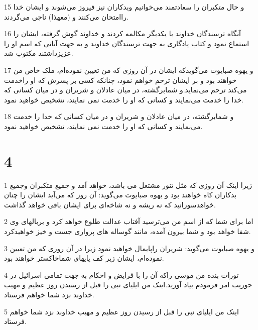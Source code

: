\par 15 و حال متکبران را سعادتمند می‌خوانیم وبدکاران نیز فیروز می‌شوند و ایشان خدا راامتحان می‌کنند و (معهذا) ناجی می‌گردند.
\par 16 آنگاه ترسندگان خداوند با یکدیگر مکالمه کردند و خداوند گوش گرفته، ایشان را استماع نمود و کتاب یادگاری به جهت ترسندگان خداوند و به جهت آنانی که اسم او را عزیزداشتند مکتوب شد.
\par 17 و یهوه صبایوت می‌گویدکه ایشان در آن روزی که من تعیین نموده‌ام، ملک خاص من خواهند بود و بر ایشان ترحم خواهم نمود، چنانکه کسی بر پسرش که او راخدمت می‌کند ترحم می‌نماید.و شمابرگشته، در میان عادلان و شریران و در میان کسانی که خدا را خدمت می‌نمایند و کسانی که او را خدمت نمی نمایند، تشخیص خواهید نمود.
\par 18 و شمابرگشته، در میان عادلان و شریران و در میان کسانی که خدا را خدمت می‌نمایند و کسانی که او را خدمت نمی نمایند، تشخیص خواهید نمود.

\chapter{4}

\par 1 زیرا اینک آن روزی که مثل تنور مشتعل می باشد، خواهد آمد و جمیع متکبران وجمیع بدکاران کاه خواهند بود و یهوه صبایوت می‌گوید: آن روز که می‌آید ایشان را چنان خواهدسوزانید که نه ریشه و نه شاخه‌ای برای ایشان باقی خواهد گذاشت.
\par 2 اما برای شما که از اسم من می‌ترسید آفتاب عدالت طلوع خواهد کرد و بربالهای وی شفا خواهد بود و شما بیرون آمده، مانند گوساله های پرواری جست و خیز خواهیدکرد.
\par 3 و یهوه صبایوت می‌گوید: شریران راپایمال خواهید نمود زیرا در آن روزی که من تعیین نموده‌ام، ایشان زیر کف پایهای شماخاکستر خواهند بود.
\par 4 تورات بنده من موسی راکه آن را با فرایض و احکام به جهت تمامی اسرائیل در حوریب امر فرمودم بیاد آورید.اینک من ایلیای نبی را قبل از رسیدن روز عظیم و مهیب خداوند نزد شما خواهم فرستاد.
\par 5 اینک من ایلیای نبی را قبل از رسیدن روز عظیم و مهیب خداوند نزد شما خواهم فرستاد.



